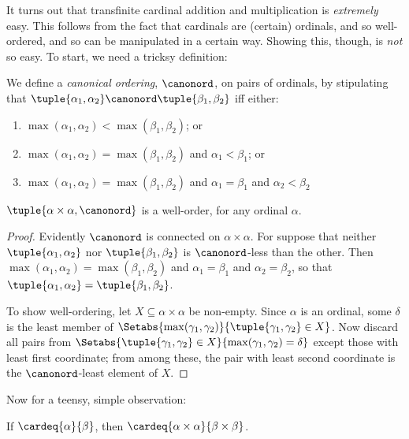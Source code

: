 \documentclass[../../../include/open-logic-section]{subfiles}
\begin{document}

It turns out that transfinite cardinal addition and multiplication is
\emph{extremely} easy. This follows from the fact that cardinals are
(certain) ordinals, and so well-ordered, and so can be manipulated in
a certain way. Showing this, though, is \emph{not} so easy. To start,
we need a tricksy definition:

\begin{defn}
We define a \emph{canonical ordering}, $\canonord$, on pairs of
ordinals, by stipulating that $\tuple{\alpha_1, \alpha_2} \canonord
\tuple{\beta_1, \beta_2}$ iff either:
\begin{enumerate}
	\item $\max(\alpha_1, \alpha_2) < \max(\beta_1, \beta_2)$; or
	\item $\max(\alpha_1, \alpha_2) = \max(\beta_1, \beta_2)$ and
	$\alpha_1 < \beta_1$; or
	\item $\max(\alpha_1, \alpha_2) = \max(\beta_1, \beta_2)$ and
	$\alpha_1 = \beta_1$ and $\alpha_2 < \beta_2$
\end{enumerate}
\end{defn}

\begin{lem}
$\tuple{\alpha \times \alpha, \canonord}$ is a well-order, for any
ordinal $\alpha$.
\end{lem}

\begin{proof}
Evidently $\canonord$ is connected on $\alpha \times \alpha$. For
suppose that neither $\tuple{\alpha_1, \alpha_2}$ nor $\tuple{\beta_1,
\beta_2}$ is $\canonord$-less than the other. Then $\max(\alpha_1,
\alpha_2) = \max(\beta_1, \beta_2)$ and $\alpha_1 = \beta_1$ and
$\alpha_2 = \beta_2$, so that $\tuple{\alpha_1, \alpha_2} =
\tuple{\beta_1,  \beta_2}$.

To show well-ordering, let $X \subseteq \alpha\times\alpha$ be
non-empty. Since $\alpha$ is an ordinal, some $\delta$ is the least
member of $\Setabs{\max(\gamma_1, \gamma_2)}{\tuple{\gamma_1,
\gamma_2} \in X}$. Now discard all pairs from
$\Setabs{\tuple{\gamma_1,\gamma_2} \in X}{\max(\gamma_1, \gamma_2) =
\delta}$ except those with least first coordinate; from among these,
the pair with least second coordinate is the $\canonord$-least element
of $X$.
\end{proof}
\noindent
Now for a teensy, simple observation:

\begin{prop}
If $\cardeq{\alpha}{\beta}$, then $\cardeq{\alpha \times \alpha}{\beta
\times \beta}$. 
\end{prop}
\end{document}
